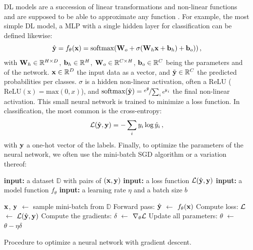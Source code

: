 \ac{DL} models are a succession of linear transformations and non-linear functions and are supposed
to be able to approximate any function \citep{gelenbe1999universalapprox}. For example, the most simple \ac{DL}
model, a \ac{MLP} with a single hidden layer for classification can be defined likewise:
%
\begin{equation}
      \hat{\mathbf{y}} = f_\theta(\mathbf{x}) = \operatorname{softmax}(\mathbf{W}_o + \sigma(\mathbf{W}_h \mathbf{x} + \mathbf{b}_h) + \mathbf{b}_o))\,,
      \label{eq:intro_mlp}
\end{equation}
%
with $\mathbf{W}_h \in \mathbb{R}^{H \times D}$, $\mathbf{b}_h \in \mathbb{R}^{H}$,
$\mathbf{W}_o \in \mathbb{R}^{C \times H}$, $\mathbf{b}_o \in \mathbb{R}^{C}$ being the parameters and of the
network. $\mathbf{x} \in \mathbb{R}^D$ the input data as a vector, and $\tilde{\mathbf{y}} \in \mathbb{R}^C$ the
predicted probabilities per classes. $\sigma$ is a hidden non-linear activation, often a \ac{ReLU}
($\operatorname{ReLU(x)} = \text{max}(0, x)$), and $\operatorname{softmax}(\tilde{\mathbf{y}}) =
      \nicefrac{e^{\tilde{\mathbf{y}}}}{\sum_{i} e^{\tilde{\mathbf{y}}_i}}$ the final non-linear activation. This small
neural network is trained to minimize a loss function. In classification, the most common is the
cross-entropy:
%
\begin{equation}
      \mathcal{L}(\hat{\mathbf{y}}, \mathbf{y}) = -\sum_i y_i \log \hat{y}_i\,,
      \label{eq:intro_ce}
\end{equation}
%
with $\mathbf{y}$ a one-hot vector of the labels. Finally, to optimize the parameters of the neural
network, we often use the mini-batch \ac{SGD} algorithm or a variation thereof:

\begin{algorithm}
      \begin{algorithmic}[1]
            \Statex \textbf{input:} a dataset $\mathbb{D}$ with pairs of $(\mathbf{x}, \mathbf{y})$
            \Statex \textbf{input:} a loss function $\mathcal{L}(\hat{\mathbf{y}}, \mathbf{y})$
            \Statex \textbf{input:} a model function $f_\theta$
            \Statex \textbf{input:} a learning rate $\eta$ and a batch size $b$
            \Statex

            \State $\mathbf{x}$, $\mathbf{y}$ $\gets$ sample mini-batch from $\mathbb{D}$
            \State Forward pass: $\hat{\mathbf{y}}$ $\gets$ $f_\theta(\mathbf{x})$
            \State Compute loss: $\mathcal{L}$ $\gets$ $\mathcal{L}(\hat{\mathbf{y}}, \mathbf{y})$
            \State Compute the gradients: $\delta$ $\gets$ $\nabla_\theta \mathcal{L}$
            \State Update all parameters: $\theta$ $\gets$ $\theta - \eta \delta$
            \EndWhile
      \end{algorithmic}
      \caption{Procedure to optimize a neural network with gradient descent.}
      \label{algo:intro_sgd}
\end{algorithm}

